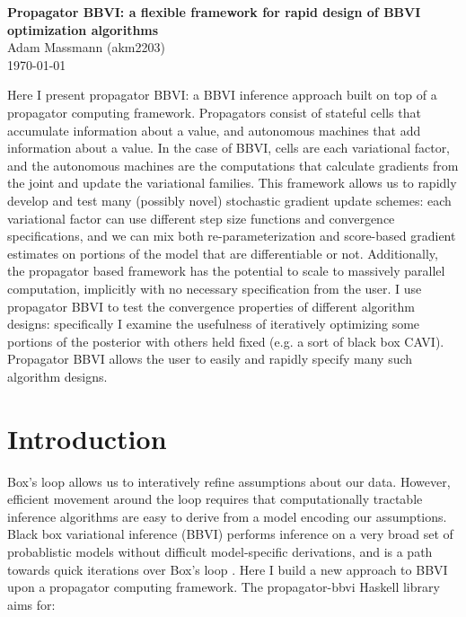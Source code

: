 \documentclass[12pt]{article}
\begin{document}
\begin{flushleft}
\textbf{Propagator BBVI: a flexible framework for rapid design of BBVI
  optimization algorithms} \\
Adam Massmann (akm2203) \\
\today
\end{flushleft}

Here I present propagator BBVI: a BBVI inference approach built on top
of a propagator computing framework. Propagators consist of stateful
cells that accumulate information about a value, and autonomous
machines that add information about a value. In the case of BBVI,
cells are each variational factor, and the autonomous machines are the
computations that calculate gradients from the joint and update the
variational families. This framework allows us to rapidly develop and
test many (possibly novel) stochastic gradient update schemes: each
variational factor can use different step size functions and
convergence specifications, and we can mix both re-parameterization
and score-based gradient estimates on portions of the model that are
differentiable or not. Additionally, the propagator based framework
has the potential to scale to massively parallel computation,
implicitly with no necessary specification from the user. I use
propagator BBVI to test the convergence properties of different
algorithm designs: specifically I examine the usefulness of
iteratively optimizing some portions of the posterior with others held
fixed (e.g. a sort of black box CAVI). Propagator BBVI allows the user
to easily and rapidly specify many such algorithm designs.


\section{Introduction}

Box's loop allows us to interatively refine assumptions about our
data. However, efficient movement around the loop requires that
computationally tractable inference algorithms are easy to derive from
a model encoding our assumptions. Black box variational inference
(BBVI) performs inference on a very broad set of probablistic models
without difficult model-specific derivations, and is a path towards
quick iterations over Box's loop \citep[e.g.,][]{ranganath-2014,
  kuc-2017}. Here I build a new approach to BBVI upon a propagator
computing framework. The propagator-bbvi Haskell library aims for:
\end{document}
